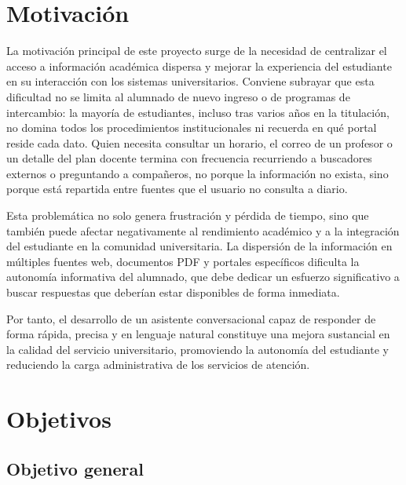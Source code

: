 \section{Motivación}
\label{sec:motivacion}

La motivación principal de este proyecto surge de la necesidad de centralizar el acceso a información académica dispersa y mejorar la experiencia del estudiante en su interacción con los sistemas universitarios. Conviene subrayar que esta dificultad no se limita al alumnado de nuevo ingreso o de programas de intercambio: la mayoría de estudiantes, incluso tras varios años en la titulación, no domina todos los procedimientos institucionales ni recuerda en qué portal reside cada dato. Quien necesita consultar un horario, el correo de un profesor o un detalle del plan docente termina con frecuencia recurriendo a buscadores externos o preguntando a compañeros, no porque la información no exista, sino porque está repartida entre fuentes que el usuario no consulta a diario.

Esta problemática no solo genera frustración y pérdida de tiempo, sino que también puede afectar negativamente al rendimiento académico y a la integración del estudiante en la comunidad universitaria. La dispersión de la información en múltiples fuentes web, documentos PDF y portales específicos dificulta la autonomía informativa del alumnado, que debe dedicar un esfuerzo significativo a buscar respuestas que deberían estar disponibles de forma inmediata.

Por tanto, el desarrollo de un asistente conversacional capaz de responder de forma rápida, precisa y en lenguaje natural constituye una mejora sustancial en la calidad del servicio universitario, promoviendo la autonomía del estudiante y reduciendo la carga administrativa de los servicios de atención.

\section{Objetivos}
\label{sec:objetivos}

\subsection{Objetivo general}
\label{subsec:objetivo-general}

